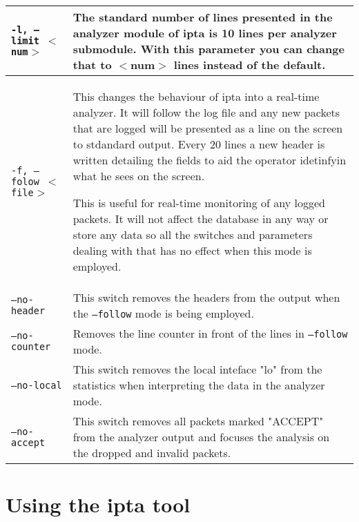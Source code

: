 \documentclass[english,twoside,openright,a4paper,12pt]{article}
\begin{document}
\begin{longtable}{|p{}|p{}|}
\texttt{-l, --limit $<$num$>$} & The standard number of lines presented in the analyzer module of ipta is 10 lines per analyzer submodule. With this parameter you can change that to $<$num$>$ lines instead of the default.\\\hline

\texttt{-f, --folow $<$file$>$} & This changes the behaviour of ipta into a real-time analyzer. It will follow the log file and any new packets that are logged will be presented as a line on the screen to stdandard output. Every 20 lines a new header is written detailing the fields to aid the operator idetinfyin what he sees on the screen. 

This is useful for real-time monitoring of any logged packets. It will not affect the database in any way or store any data so all the switches and parameters dealing with that has no effect when this mode is employed.\\\hline

\texttt{--no-header} & This switch removes the headers from the output when the \texttt{--follow} mode is being employed.\\\hline

\texttt{--no-counter} & Removes the line counter in front of the lines in \texttt{--follow} mode.\\\hline

\texttt{--no-local} & This switch removes the local inteface "lo" from the statistics when interpreting the data in the analyzer mode.\\\hline

\texttt{--no-accept} & This switch removes all packets marked "ACCEPT" from the analyzer output and focuses the analysis on the dropped and invalid packets.\\\hline
\end{longtable}

\section{Using the ipta tool}
\end{document}
